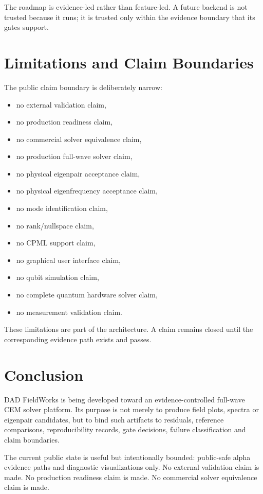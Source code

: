 \documentclass[11pt,a4paper]{article}
\begin{document}
The roadmap is evidence-led rather than feature-led. A future backend is not trusted because it runs; it is trusted only within the evidence boundary that its gates support.

\section{Limitations and Claim Boundaries}

The public claim boundary is deliberately narrow:

\begin{itemize}
  \item no external validation claim,
  \item no production readiness claim,
  \item no commercial solver equivalence claim,
  \item no production full-wave solver claim,
  \item no physical eigenpair acceptance claim,
  \item no physical eigenfrequency acceptance claim,
  \item no mode identification claim,
  \item no rank/nullspace claim,
  \item no CPML support claim,
  \item no graphical user interface claim,
  \item no qubit simulation claim,
  \item no complete quantum hardware solver claim,
  \item no measurement validation claim.
\end{itemize}

These limitations are part of the architecture. A claim remains closed until the corresponding evidence path exists and passes.

\section{Conclusion}

DAD FieldWorks is being developed toward an evidence-controlled full-wave CEM solver platform. Its purpose is not merely to produce field plots, spectra or eigenpair candidates, but to bind such artifacts to residuals, reference comparisons, reproducibility records, gate decisions, failure classification and claim boundaries.

The current public state is useful but intentionally bounded: public-safe alpha evidence paths and diagnostic visualizations only. No external validation claim is made. No production readiness claim is made. No commercial solver equivalence claim is made.
\end{document}
